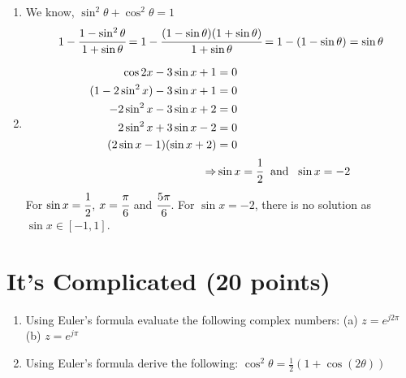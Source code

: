 \documentclass[12pt, xcolor=dvipsnames,svgnames,x11names]{article}
\makeatletter
\newenvironment{multiequation}[1][]{%
\begin{equation}%
   \begin{aligned}%
   \ifx#1\@empty\else\label{#1}\fi%
}{%
   \end{aligned}%
\end{equation}%
}
\makeatother
\begin{document}
   \begin{answerbox}
   
   \begin{enumerate}
    \item 

    We know, $ \sin^2\theta  + \cos^2\theta = 1$
    \begin{multiequation}
        1- \cfrac{1-\sin^2\theta}{1+\sin\theta} =1 - \cfrac{(1-\sin\theta)(1+\sin\theta)}{1+\sin\theta} = 1 - (1 - \sin\theta) 
        = \sin\theta
    \end{multiequation}
    \item \begin{multiequation}
             \cos 2x - 3\sin x + 1 & = 0\\
             (1-2\sin^2 x) - 3\sin x + 1 & = 0\\
             -2\sin^2x - 3\sin x + 2 & = 0\\
             2\sin^2x + 3\sin x - 2 & = 0\\
             (2\sin x-1)(\sin x + 2) & = 0\\
             \Rightarrow & \sin x = \cfrac{1}{2} \textrm{~~and~~} \sin x = -2
    \end{multiequation}
    For $\sin x = \cfrac{1}{2}$, $x = \cfrac{\pi}{6}$ and $\cfrac{5\pi}{6}$. For $\sin x = -2$, there is no solution as $\sin x \in [-1,1]$.
\end{enumerate}


   \end{answerbox}

   \section{It's Complicated (20 points)}
   \begin{enumerate}


      \item Using Euler’s formula evaluate the following complex numbers: (a) $ z = e^{j2\pi}$ (b) $z = e^{j\pi}$

      \item Using Euler’s formula derive the following: $\cos^2 \theta = \tfrac{1}{2}( 1 + \cos (2\theta))$
   \end{enumerate}
\end{document}

